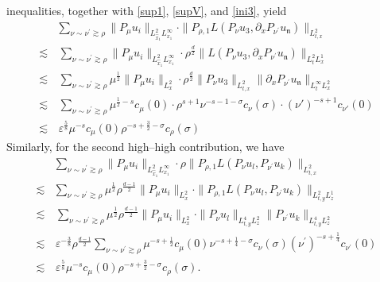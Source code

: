 \documentclass[11pt,letterpaper,reqno]{amsart}
\numberwithin{equation}{section}
\theoremstyle{definition}
\theoremstyle{remark}
\begin{document}
inequalities, together with \eqref{sup1}, \eqref{supV}, and
\eqref{ini3}, yield
   \begin{align}
     & \sum_{\nu \sim \nu^\prime \gtrsim \rho}   \|P_\mu u_{i}\|_{L^2_{\widehat{x}_1} L^\infty_{x_1}}  \cdot    \| P_{\rho,1} L (P_{\nu} u_3,   \partial_x  P_{\nu^\prime }
u_{\mathfrak{n}})  \|_{L^2_{t,x}}  \label{ell.bi.t1} \\
\lesssim &\, \sum_{\nu \sim \nu^\prime \gtrsim \rho}   \|P_\mu u_{i}\|_{L^2_{\widehat{x}_1} L^\infty_{x_1}}  \cdot   \rho^{\frac d2} \|  L (P_{\nu} u_3,   \partial_x  P_{\nu^\prime }
u_{\mathfrak{n}})  \|_{L^2_{t} L^1_x}  \nonumber\\
\lesssim &\, \sum_{\nu \sim \nu^\prime \gtrsim \rho}  \mu^{\frac12} \|P_\mu u_{i}\|_{L^2_x}   \cdot   \rho^{\frac d2} \|  P_{\nu} u_3  \|_{L^2_{t,x}  }    \|    \partial_x  P_{\nu^\prime }
u_{\mathfrak{n}} \|_{ L^\infty_t  L^2_x} \nonumber \\
\lesssim &\, \sum_{\nu \sim \nu^\prime \gtrsim \rho}  \mu^{\frac12-s} c_\mu(0) \cdot \rho^{s+1} \nu^{-s-1-\sigma} c_\nu(\sigma) \cdot (\nu')^{-s+1}   c_{\nu'} (0)\nonumber\\
\lesssim &\, \varepsilon^{\frac58}\mu^{-s} c_\mu(0) \rho^{-s+\frac 32 -\sigma} c_\rho(\sigma) \nonumber
   \end{align}
 Similarly, for the second high--high contribution, we have
  \begin{align}
   &\sum_{\nu \sim \nu^\prime \gtrsim \rho} \|P_\mu u_{i}\|_{L^2_{\widehat{x}_1} L^\infty_{x_1}}  \cdot   \rho  \| P_{\rho,1} L (P_{\nu} u_l,     P_{\nu^\prime }
u_k) \big\|_{L^2_{t,x}} \label{ell.bi.t2} \\
 \lesssim &\sum_{\nu \sim \nu^\prime \gtrsim \rho} \mu^{\frac 12} \rho^{\frac{d-1}{2}} \|P_\mu u_{i}\|_{L^2_{x}  }  \cdot    \| P_{\rho,1} L (P_{\nu} u_l,   P_{\nu^\prime }
u_k) \big\|_{L^2_{t,y} L^1_z} \nonumber\\
   \lesssim &\,\sum_{\nu \sim \nu^\prime \gtrsim \rho}  \mu^{\frac 12} \rho^{\frac{d-1}{2}}   \|P_\mu u_{i}\|_{L^2_{x}} \cdot \| P_{\nu} u_l\|_{ L^4_{t,y} L_z^2} \| P_{\nu^\prime }
u_k\|_{L^4_{t,y} L_z^2 } \nonumber\\
 \lesssim & \,\varepsilon^{-\frac 38} \rho^{\frac {d-1}2} \sum_{\nu \sim \nu^\prime \gtrsim \rho} \mu^{-s+\frac 12} c_\mu(0)   \nu^{-s+\frac 14-\sigma} c_{\nu } (\sigma)  (\nu^\prime) ^{-s+\frac 14} c_{\nu^\prime } (0) \nonumber\\
 \lesssim &\, \varepsilon^{\frac58}\mu^{-s} c_\mu(0) \rho^{-s+\frac 32 -\sigma} c_\rho(\sigma). \nonumber
\end{align}
\end{document}
